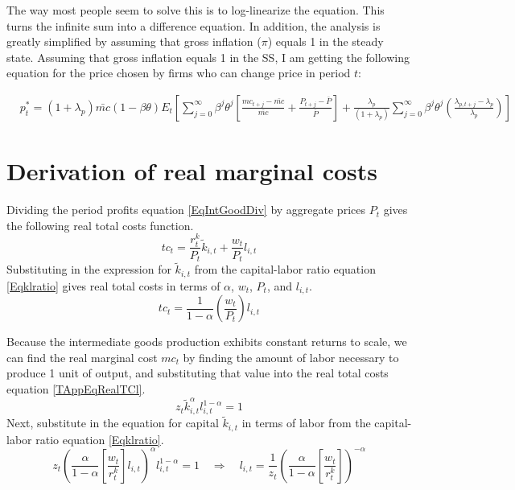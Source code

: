 The way most people seem to solve this is to log-linearize the equation.  This turns the infinite sum into a difference equation.  In addition, the analysis is greatly simplified by assuming that gross inflation ($\pi$) equals 1 in the steady state.  Assuming that gross inflation equals 1 in the SS, I am getting the following equation for the price chosen by firms who can change price in period $t$:

\begin{equation}
\begin{split}
 &   p_{t}^{*}=(1+\lambda_{p})\bar{mc}(1-\beta\theta)E_{t}\left[\sum_{j=0}^{\infty}\beta^{j}\theta^{j}\left[\frac{mc_{t+j}-\bar{mc}}{\bar{mc}}+\frac{P_{t+j}-\bar{P}}{\bar{P}}\right]+\frac{\lambda_{p}}{(1+\lambda_{p})}\sum_{j=0}^{\infty}\beta^{j}\theta^{j}\left(\frac{\lambda_{p,t+j}-\lambda_{p}}{\lambda_{p}}\right)\right]
\end{split}
\end{equation}



\newpage
\setcounter{equation}{0} %
\section{Derivation of real marginal costs}\label{TAppRealMC}

Dividing the period profits equation \eqref{EqIntGoodDiv} by aggregate prices $P_t$ gives the following real total costs function.
\begin{equation}\label{TAppEqRealTC}
   tc_t = \frac{r_t^k}{P_t}\tilde{k}_{i,t} + \frac{w_t}{P_t}l_{i,t}
\end{equation}
Substituting in the expression for $\tilde{k}_{i,t}$ from the capital-labor ratio equation \eqref{Eqklratio} gives real total costs in terms of $\alpha$, $w_t$, $P_t$, and $l_{i,t}$.
\begin{equation}\label{TAppEqRealTCl}
   tc_t = \frac{1}{1-\alpha}\left(\frac{w_t}{P_t}\right)l_{i,t}
\end{equation}

Because the intermediate goods production exhibits constant returns to scale, we can find the real marginal cost $mc_t$ by finding the amount of labor necessary to produce 1 unit of output, and substituting that value into the real total costs equation \eqref{TAppEqRealTCl}.
\begin{equation}\label{TAppEqlunitprod1}
   z_t\tilde{k}_{i,t}^\alpha l_{i,t}^{1-\alpha} = 1
\end{equation}
Next, substitute in the equation for capital $\tilde{k}_{i,t}$ in terms of labor from the capital-labor ratio equation \eqref{Eqklratio}.
\begin{equation}\label{TAppEqlunitprod2}
   z_t\left(\frac{\alpha}{1-\alpha}\left[\frac{w_t}{r_t^k}\right]l_{i,t}\right)^\alpha l_{i,t}^{1-\alpha} = 1 \quad\Rightarrow\quad l_{i,t} = \frac{1}{z_t}\left(\frac{\alpha}{1-\alpha}\left[\frac{w_t}{r_t^k}\right]\right)^{-\alpha}
\end{equation}

